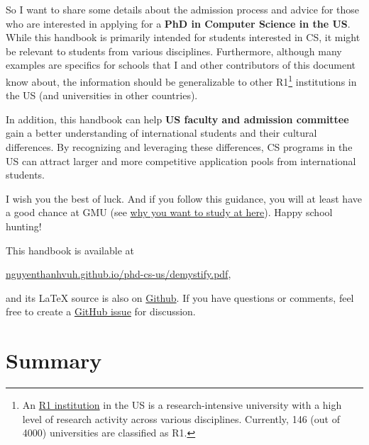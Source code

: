 \documentclass[oneside,11pt]{book}
\begin{document}
So I want to share some details about the admission process and advice for those who are interested in applying for a \textbf{PhD in Computer Science in the US}.
While this handbook is primarily intended for students interested in CS, it might be relevant to students from various disciplines.
Furthermore, although many examples are specifics for schools that I and other contributors of this document know about, the information should be generalizable to other R1\footnote{An \href{https://en.wikipedia.org/wiki/List_of_research_universities_in_the_United_States}{R1 institution} in the US is a research-intensive university with a high level of research activity across various disciplines. Currently, 146 (out of 4000) universities are classified as R1.} institutions in the US (and universities in other countries).

In addition, this handbook can help \textbf{US faculty and admission committee} gain a better understanding of international students and their cultural differences.  By recognizing and leveraging these differences, CS programs in the US can attract larger and more competitive application pools from international students.

I wish you the best of luck. And if you follow this guidance, you will at least have a good chance at GMU (see
\href{https://github.com/dynaroars/dynaroars.github.io/wiki/About-GMU}{why
  you want to study at here}). Happy school hunting!

This handbook is available at

\begin{center}
  \href{https://nguyenthanhvuh.github.io/phd-cs-us/demystify.pdf}{nguyenthanhvuh.github.io/phd-cs-us/demystify.pdf},
\end{center}

\noindent and its \LaTeX{} source is also on \href{https://github.com/nguyenthanhvuh/phd-cs-us}{Github}. If you have questions or comments, feel free to create a \href{https://github.com/nguyenthanhvuh/phd-cs-us/issues}{GitHub issue} for discussion.

\newpage
\tableofcontents*

\chapter{Summary}\label{sec:summary}
\end{document}

